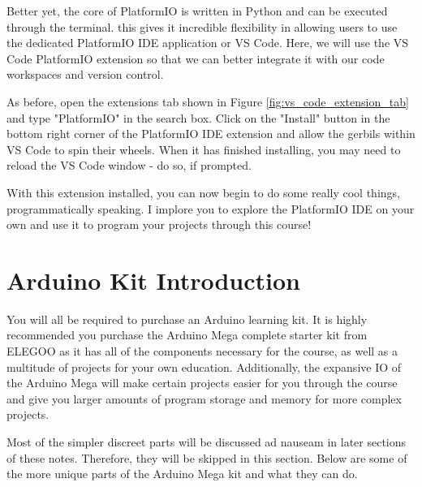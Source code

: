     Better yet, the core of PlatformIO is written in Python and can be executed through the terminal.
    this gives it incredible flexibility in allowing users to use the dedicated PlatformIO IDE application or VS Code.
    Here, we will use the VS Code PlatformIO extension so that we can better integrate it with our code workspaces and version control.

    As before, open the extensions tab shown in Figure \ref{fig:vs_code_extension_tab} and type "PlatformIO" in the search box.
    Click on the "Install" button in the bottom right corner of the PlatformIO IDE extension and allow the gerbils within VS Code to spin their wheels.
    When it has finished installing, you may need to reload the VS Code window - do so, if prompted.

    With this extension installed, you can now begin to do some really cool things, programmatically speaking.
    I implore you to explore the PlatformIO IDE on your own and use it to program your projects through this course!

\pagebreak

\section{Arduino Kit Introduction}

You will all be required to purchase an Arduino learning kit. 
It is highly recommended you purchase the Arduino Mega complete starter kit from ELEGOO as it has all of the components necessary for the course, as well as a multitude of projects for your own education.
Additionally, the expansive IO of the Arduino Mega will make certain projects easier for you through the course and give you larger amounts of program storage and memory for more complex projects.

Most of the simpler discreet parts will be discussed ad nauseam in later sections of these notes.
Therefore, they will be skipped in this section.
Below are some of the more unique parts of the Arduino Mega kit and what they can do.
    
